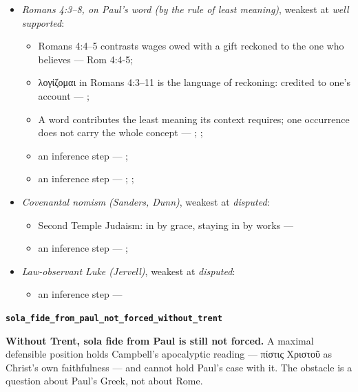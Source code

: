 \documentclass[11pt]{article}
\begin{document}
\begin{itemize}
\begin{itemize}
\end{itemize}
\item \emph{Romans 4:3–8, on Paul's word (by the rule of least meaning)}, weakest at \emph{well supported}:
\begin{itemize}
\item Romans 4:4–5 contrasts wages owed with a gift reckoned to the one who believes --- Rom 4:4-5; \cite[III.xi.18]{calvin-institutes-1960}
\item λογίζομαι in Romans 4:3–11 is the language of reckoning: credited to one's account --- \cite[s.v. λογίζομαι]{bauer-danker-lexicon-2000}; \cite[ad loc. Rom 4:3]{moo-romans-1996}
\item A word contributes the least meaning its context requires; one occurrence does not carry the whole concept --- \cite{silva-biblical-words-1994}; \cite{joos-semantic-axiom-1972}; \cite{barr-semantics-2004}
\item an inference step --- \cite[ad loc. Rom 4:6]{moo-romans-1996}; \cite[s.v. λογίζομαι]{bauer-danker-lexicon-2000}
\item an inference step --- \cite{silva-biblical-words-1994}; \cite[p. 80]{moo-romans-1996}; \cite{barr-semantics-2004}
\end{itemize}
\item \emph{Covenantal nomism (Sanders, Dunn)}, weakest at \emph{disputed}:
\begin{itemize}
\item Second Temple Judaism: in by grace, staying in by works --- \cite{sanders-paul-palestinian-judaism-1977}
\item an inference step --- \cite{dunn-new-perspective-2005}; \cite{wright-what-paul-said-1997}
\end{itemize}
\item \emph{Law-observant Luke (Jervell)}, weakest at \emph{disputed}:
\begin{itemize}
\item an inference step --- \cite{jervell-luke-people-god-1972}
\end{itemize}
\end{itemize}
\par\medskip\noindent\textbf{\texttt{sola\_\allowbreak{}fide\_\allowbreak{}from\_\allowbreak{}paul\_\allowbreak{}not\_\allowbreak{}forced\_\allowbreak{}without\_\allowbreak{}trent}}\par\nobreak\noindent
\textbf{Without Trent, sola fide from Paul is still not forced.} A maximal defensible position holds Campbell's apocalyptic reading — πίστις Χριστοῦ as Christ's own faithfulness — and cannot hold Paul's case with it. The obstacle is a question about Paul's Greek, not about Rome.
\end{document}
